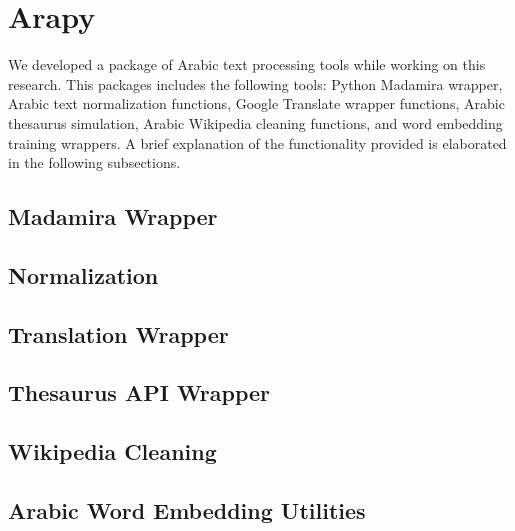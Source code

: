 \section{Arapy}

We developed a package of Arabic text processing tools while working on this research. This packages includes the following tools: Python Madamira wrapper, Arabic text normalization functions, Google Translate wrapper functions, Arabic thesaurus simulation, Arabic Wikipedia cleaning functions, and word embedding training wrappers. A brief explanation of the functionality provided is elaborated in the following subsections.

\subsection{Madamira Wrapper}

\subsection{Normalization}

\subsection{Translation Wrapper}

\subsection{Thesaurus API Wrapper}

\subsection{Wikipedia Cleaning}

\subsection{Arabic Word Embedding Utilities}

\label{sec:arapy}
